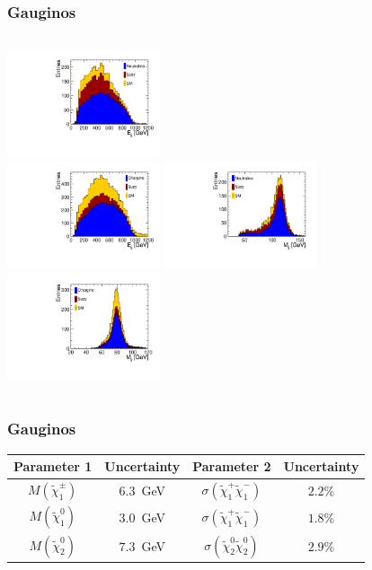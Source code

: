 \documentclass{beamer}
\begin{document}
\begin{frame}
\frametitle{Gauginos}
\begin{columns}[c]
\column{4.5cm}
\centering
\includegraphics[width=4.5cm]{../SIDWorkshop/NeutralinoSel_E.pdf}\\
\includegraphics[width=4.5cm]{../SIDWorkshop/CharginoSel_E.pdf}
\column{4.5cm}
\centering
\includegraphics[width=4.5cm]{../SIDWorkshop/NeutralinoSel_M.pdf}\\
\includegraphics[width=4.5cm]{../SIDWorkshop/CharginoSel_M.pdf}
\end{columns}
\end{frame}
\begin{frame}
\frametitle{Gauginos}
\begin{center}
\begin{tabular}{c c c c}
       \toprule
       Parameter 1                & Uncertainty &          Parameter 2 & Uncertainty \\
       \midrule
       $M(\tilde{\chi}_{1}^{\pm})$ & $6.3$~GeV & $\sigma(\tilde{\chi}_{1}^{+}\tilde{\chi}_{1}^{-})$  & $2.2$\% \\
       $M(\tilde{\chi}_{1}^{0})$   & $3.0$~GeV & $\sigma(\tilde{\chi}_{1}^{+}\tilde{\chi}_{1}^{-})$  & $1.8$\% \\
       $M(\tilde{\chi}_{2}^{0})$   & $7.3$~GeV & $\sigma(\tilde{\chi}_{2}^{0}\tilde{\chi}_{2}^{0})$  & $2.9$\% \\
\end{tabular}
\end{center}
\end{frame}
\end{document}
